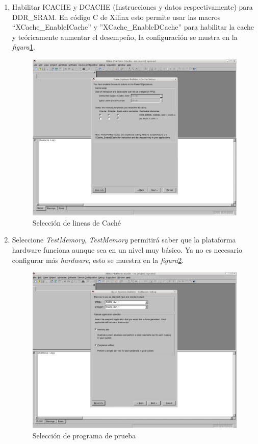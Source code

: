 \begin{enumerate}
\item Habilitar ICACHE y DCACHE (Instrucciones y datos respectivamente) para
DDR\_SRAM. En código C de Xilinx esto permite usar las macros
``XCache\_EnableICache'' y ''XCache\_EnableDCache'' para habilitar la cache y
teóricamente aumentar el desempeño, la configuración se mustra en la
\emph{figura}\ref{Selección de lineas de Caché}.
  \begin{figure}[h!] 
  \centering
  \includegraphics[scale=.25]{./figuras/EDK10.png}
  \caption{Selección de lineas de Caché}
  \label{Selección de lineas de Caché}
  \end{figure}
  
  
\item Seleccione \emph{TestMemory}, \emph{TestMemory} permitirá saber que la
plataforma hardware funciona aunque sea en un nivel muy básico. Ya no es
necesario configurar más \emph{hardware}, esto se muestra en la
\emph{figura}\ref{Selección de programa de prueba}.
  \begin{figure}[h!] 
  \centering
  \includegraphics[scale=.25]{./figuras/EDK11.png}
  \caption{Selección de programa de prueba}
  \label{Selección de programa de prueba}
  \end{figure}
  

\end{enumerate}
